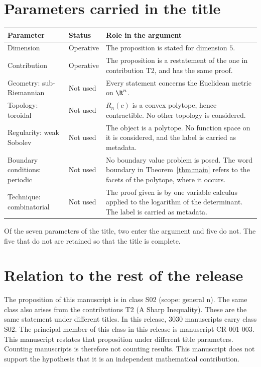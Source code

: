 \documentclass[11pt]{article}
\begin{document}
\section{Parameters carried in the title}\label{sec:params}
\begin{center}
\small
\begin{tabular}{p{}p{}p{}}
\toprule
Parameter & Status & Role in the argument \\
\midrule
Dimension & Operative & The proposition is stated for dimension $5$. \\
Contribution & Operative & The proposition is a restatement of the one in contribution T2, and has the same proof. \\
Geometry: sub-Riemannian & Not used & Every statement concerns the Euclidean metric on $\R^n$. \\
Topology: toroidal & Not used & $R_n(c)$ is a convex polytope, hence contractible. No other topology is considered. \\
Regularity: weak Sobolev & Not used & The object is a polytope. No function space on it is considered, and the label is carried as metadata. \\
Boundary conditions: periodic & Not used & No boundary value problem is posed. The word boundary in Theorem~\ref{thm:main} refers to the facets of the polytope, where it occurs. \\
Technique: combinatorial & Not used & The proof given is by one variable calculus applied to the logarithm of the determinant. The label is carried as metadata. \\
\bottomrule
\end{tabular}
\end{center}
Of the seven parameters of the title, two enter the argument and five do not. The five that do not are retained so that the title is complete.

\section{Relation to the rest of the release}
The proposition of this manuscript is in class S02 (scope: general n). The same class also arises from the contributions T2 (A Sharp Inequality). These are the same statement under different titles.
In this release, 3030 manuscripts carry class S02. The principal member of this class in this release is manuscript CR-001-003. This manuscript restates that proposition under different title parameters.
Counting manuscripts is therefore not counting results. This manuscript does not support the hypothesis that it is an independent mathematical contribution.
\end{document}
